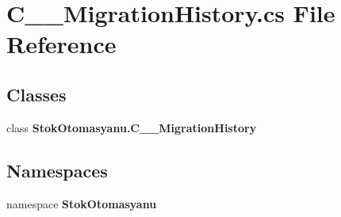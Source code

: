 \section{C\+\_\+\+\_\+\+Migration\+History.\+cs File Reference}
\label{_c_____migration_history_8cs}
\subsection*{Classes}
\begin{DoxyCompactItemize}
\item 
class \textbf{ Stok\+Otomasyanu.\+C\+\_\+\+\_\+\+Migration\+History}
\end{DoxyCompactItemize}
\subsection*{Namespaces}
\begin{DoxyCompactItemize}
\item 
namespace \textbf{ Stok\+Otomasyanu}
\end{DoxyCompactItemize}
